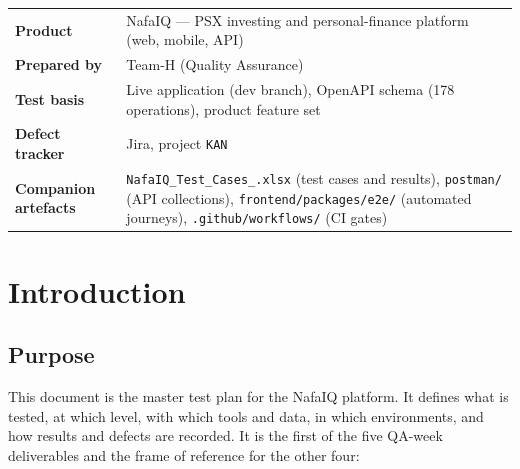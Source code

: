 \documentclass[11pt,a4paper]{article}
\newcommand{\coverstat}[2]{%
  \begin{minipage}[t]{0.23\textwidth}\centering
    {\color{gold}\bfseries\LARGE #1}\\[3pt]
    {\color{mist}\footnotesize\scshape #2}
  \end{minipage}}
\begin{document}
\begin{titlepage}
\end{titlepage}

\setcounter{page}{1}
\thispagestyle{empty}
{\hypersetup{linkcolor=navy}\tableofcontents}
\vfill
\begin{center}
\begin{tabularx}{\textwidth}{lL}
\toprule
\textbf{Product} & NafaIQ --- PSX investing and personal-finance platform (web, mobile, API) \\
\textbf{Prepared by} & Team-H (Quality Assurance) \\
\textbf{Test basis} & Live application (dev branch), OpenAPI schema (178 operations), product feature set \\
\textbf{Defect tracker} & Jira, project \texttt{KAN} \\
\textbf{Companion artefacts} & \texttt{NafaIQ\_Test\_Cases\_.xlsx} (test cases and results), \texttt{postman/} (API collections), \texttt{frontend/packages/e2e/} (automated journeys), \texttt{.github/workflows/} (CI gates) \\
\bottomrule
\end{tabularx}
\end{center}
\newpage

\section{Introduction}

\subsection{Purpose}
This document is the master test plan for the NafaIQ platform. It defines what
is tested, at which level, with which tools and data, in which environments,
and how results and defects are recorded. It is the first of the five QA-week
deliverables and the frame of reference for the other four:
\end{document}
